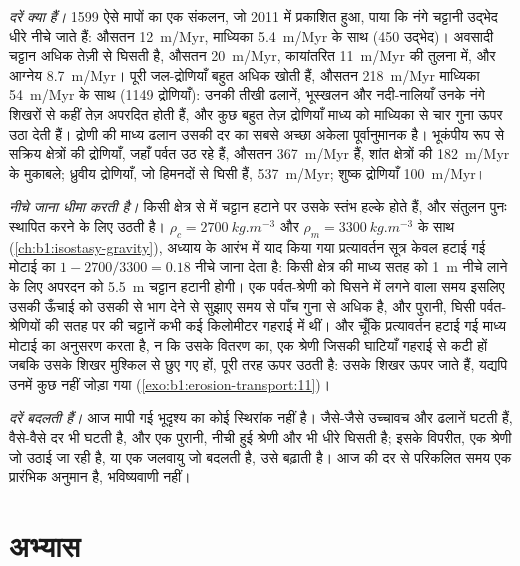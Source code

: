 \emph{दरें क्या हैं।} \num{1599} ऐसे मापों का एक संकलन, जो 2011 में प्रकाशित हुआ, पाया कि नंगे चट्टानी उद्भेद धीरे नीचे जाते हैं: औसतन \qty{12}{m/Myr}, माध्यिका \qty{5.4}{m/Myr} के साथ (450 उद्भेद)। अवसादी चट्टान अधिक तेज़ी से घिसती है, औसतन \qty{20}{m/Myr}, कायांतरित \qty{11}{m/Myr} की तुलना में, और आग्नेय \qty{8.7}{m/Myr}। पूरी जल-द्रोणियाँ बहुत अधिक खोती हैं, औसतन \qty{218}{m/Myr} माध्यिका \qty{54}{m/Myr} के साथ (\num{1149} द्रोणियाँ): उनकी तीखी ढलानें, भूस्खलन और नदी-नालियाँ उनके नंगे शिखरों से कहीं तेज़ अपरदित होती हैं, और कुछ बहुत तेज़ द्रोणियाँ माध्य को माध्यिका से चार गुना ऊपर उठा देती हैं। द्रोणी की माध्य ढलान उसकी दर का सबसे अच्छा अकेला पूर्वानुमानक है। भूकंपीय रूप से सक्रिय क्षेत्रों की द्रोणियाँ, जहाँ पर्वत उठ रहे हैं, औसतन \qty{367}{m/Myr} हैं, शांत क्षेत्रों की \qty{182}{m/Myr} के मुकाबले; ध्रुवीय द्रोणियाँ, जो हिमनदों से घिसी हैं, \qty{537}{m/Myr}; शुष्क द्रोणियाँ \qty{100}{m/Myr}।

\emph{ नीचे जाना धीमा करती है।} किसी क्षेत्र से  में चट्टान हटाने पर उसके स्तंभ हल्के होते हैं, और संतुलन पुनः स्थापित करने के लिए  उठती है। $\rho_c
= \qty{2700}{kg.m^{-3}}$ और $\rho_m = \qty{3300}{kg.m^{-3}}$ के साथ (\cref{ch:b1:isostasy-gravity}), अध्याय के आरंभ में याद किया गया प्रत्यावर्तन सूत्र केवल हटाई गई मोटाई का $1 - 2700/3300 = 0.18$ नीचे जाना देता है: किसी क्षेत्र की माध्य सतह को \qty{1}{m} नीचे लाने के लिए अपरदन को \qty{5.5}{m} चट्टान हटानी होगी। एक पर्वत-श्रेणी को घिसने में लगने वाला समय इसलिए उसकी ऊँचाई को उसकी  से भाग देने से सुझाए समय से पाँच गुना से अधिक है, और पुरानी, घिसी पर्वत-श्रेणियों की सतह पर की चट्टानें कभी कई किलोमीटर गहराई में थीं। और चूँकि प्रत्यावर्तन हटाई गई माध्य मोटाई का अनुसरण करता है, न कि उसके वितरण का, एक श्रेणी जिसकी घाटियाँ गहराई से कटी हों जबकि उसके शिखर मुश्किल से छुए गए हों, पूरी तरह ऊपर उठती है: उसके शिखर ऊपर जाते हैं, यद्यपि उनमें कुछ नहीं जोड़ा गया (\cref{exo:b1:erosion-transport:11})।

\emph{दरें बदलती हैं।} आज मापी गई  भूदृश्य का कोई स्थिरांक नहीं है। जैसे-जैसे उच्चावच और ढलानें घटती हैं, वैसे-वैसे दर भी घटती है, और एक पुरानी, नीची हुई श्रेणी और भी धीरे घिसती है; इसके विपरीत, एक श्रेणी जो उठाई जा रही है, या एक जलवायु जो बदलती है, उसे बढ़ाती है। आज की दर से परिकलित समय एक प्रारंभिक अनुमान है, भविष्यवाणी नहीं।

\section{अभ्यास}

